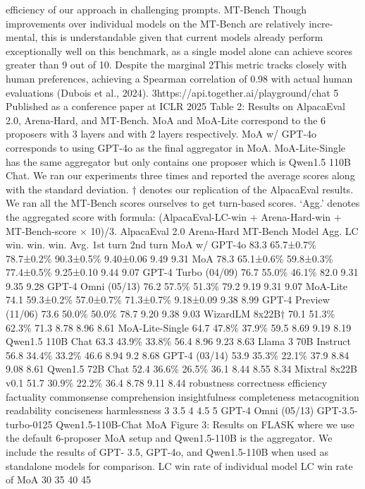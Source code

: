 efficiency of our approach in challenging prompts.
MT-Bench
Though improvements over individual models on the MT-Bench are relatively incre-
mental, this is understandable given that current models already perform exceptionally well on this
benchmark, as a single model alone can achieve scores greater than 9 out of 10. Despite the marginal
2This metric tracks closely with human preferences, achieving a Spearman correlation of 0.98 with actual
human evaluations (Dubois et al., 2024).
3https://api.together.ai/playground/chat
5
Published as a conference paper at ICLR 2025
Table 2: Results on AlpacaEval 2.0, Arena-Hard, and MT-Bench. MoA and MoA-Lite correspond to
the 6 proposers with 3 layers and with 2 layers respectively. MoA w/ GPT-4o corresponds to using
GPT-4o as the final aggregator in MoA. MoA-Lite-Single has the same aggregator but only contains
one proposer which is Qwen1.5 110B Chat. We ran our experiments three times and reported the
average scores along with the standard deviation. † denotes our replication of the AlpacaEval results.
We ran all the MT-Bench scores ourselves to get turn-based scores. ‘Agg.’ denotes the aggregated
score with formula: (AlpacaEval-LC-win + Arena-Hard-win + MT-Bench-score × 10)/3.
AlpacaEval 2.0
Arena-Hard
MT-Bench
Model
Agg.
LC win.
win.
win.
Avg.
1st turn
2nd turn
MoA w/ GPT-4o
83.3
65.7±0.7\%
78.7±0.2\%
90.3±0.5\%
9.40±0.06
9.49
9.31
MoA
78.3
65.1±0.6\%
59.8±0.3\%
77.4±0.5\%
9.25±0.10
9.44
9.07
GPT-4 Turbo (04/09)
76.7
55.0\%
46.1\%
82.0
9.31
9.35
9.28
GPT-4 Omni (05/13)
76.2
57.5\%
51.3\%
79.2
9.19
9.31
9.07
MoA-Lite
74.1
59.3±0.2\%
57.0±0.7\%
71.3±0.7\%
9.18±0.09
9.38
8.99
GPT-4 Preview (11/06)
73.6
50.0\%
50.0\%
78.7
9.20
9.38
9.03
WizardLM 8x22B†
70.1
51.3\%
62.3\%
71.3
8.78
8.96
8.61
MoA-Lite-Single
64.7
47.8\%
37.9\%
59.5
8.69
9.19
8.19
Qwen1.5 110B Chat
63.3
43.9\%
33.8\%
56.4
8.96
9.23
8.63
Llama 3 70B Instruct
56.8
34.4\%
33.2\%
46.6
8.94
9.2
8.68
GPT-4 (03/14)
53.9
35.3\%
22.1\%
37.9
8.84
9.08
8.61
Qwen1.5 72B Chat
52.4
36.6\%
26.5\%
36.1
8.44
8.55
8.34
Mixtral 8x22B v0.1
51.7
30.9\%
22.2\%
36.4
8.78
9.11
8.44
robustness
correctness
efficiency
factuality
commonsense
comprehension
insightfulness
completeness
metacognition
readability
conciseness
harmlessness
3
3.5
4
4.5
5
GPT-4 Omni (05/13)
GPT-3.5-turbo-0125
Qwen1.5-110B-Chat
MoA
Figure 3: Results on FLASK where we use the
default 6-proposer MoA setup and Qwen1.5-110B
is the aggregator. We include the results of GPT-
3.5, GPT-4o, and Qwen1.5-110B when used as
standalone models for comparison.
LC win rate of individual model
LC win rate of MoA
30
35
40
45
